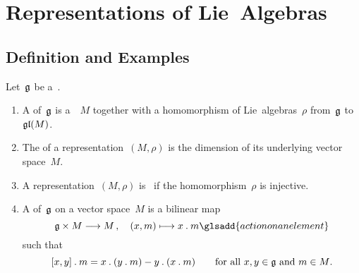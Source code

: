 \chapter{Representations of Lie~Algebras}





\section{Definition and Examples}


\begin{definition}
	Let~$\mathfrak{g}$ be a~{\liealgebra{$\kf$}}.
	\begin{enumerate}
		\item
			A  of~$\mathfrak{g}$ is a~{\vectorspace{$\kf$}}~$M$ together with a homomorphism of Lie~algebras~$\rho$ from~$\mathfrak{g}$ to~$\mathfrak{gl}(M)$.
		\item
			The  of a representation~$(M, \rho)$ is the dimension of its underlying vector space~$M$.
		\item
			A representation~$(M, \rho)$ is~ if the homomorphism~$\rho$ is injective.
		\item
			A  of~$\mathfrak{g}$ on a vector space~$M$ is a bilinear map
			\[
				\glie \times M \to M \,,
				\quad
				(x,m) \mapsto x \act m
				\glsadd{action on an element}
			\]
			such that
			\[
				[x,y] \mathbin{.} m
				=
				x \mathbin{.} (y \mathbin{.} m) - y \mathbin{.} (x \mathbin{.} m)
				\qquad
				\text{for all~$x, y \in \mathfrak{g}$ and~$m \in M$.}
			\]
	\end{enumerate}
\end{definition}


